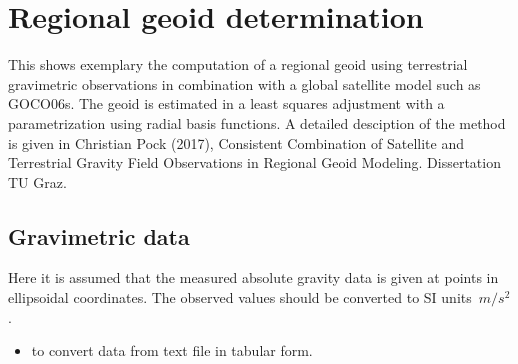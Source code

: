 \section{Regional geoid determination}\label{cookbook.regionalGeoid}
This shows exemplary the computation of a regional geoid using terrestrial gravimetric observations
in combination with a global satellite model such as GOCO06s. The geoid is estimated in a least squares adjustment with
a parametrization using radial basis functions. A detailed desciption of the method is given in
Christian Pock (2017), Consistent Combination of Satellite and Terrestrial Gravity Field Observations in Regional Geoid Modeling.
Dissertation TU Graz.


\subsection{Gravimetric data}
Here it is assumed that the measured absolute gravity data is given at points in ellipsoidal coordinates.
The observed values should be converted to SI units~$m/s^2$.
\begin{itemize}
  \item {} to convert data from text file in tabular form.
\end{itemize}


